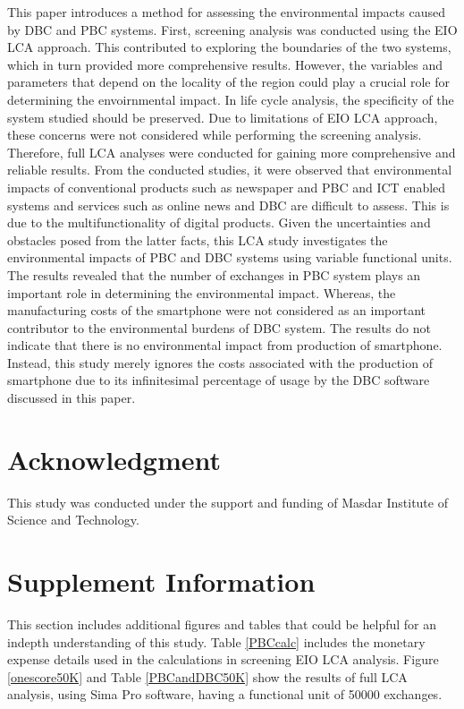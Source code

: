 \documentclass[conference]{IEEEtran}
\begin{document}
This paper introduces a method for assessing the environmental impacts caused by DBC and PBC systems. First, screening analysis was conducted using the EIO LCA approach. This contributed to exploring the boundaries of the two systems, which in turn provided more comprehensive results. However, the variables and parameters that depend on the locality of the region could play a crucial role for determining the envoirnmental impact. In life cycle analysis, the specificity of the system studied should be preserved. Due to limitations of EIO LCA approach, these concerns were not considered while performing the screening analysis. Therefore, full LCA analyses were conducted for gaining more comprehensive and reliable results. From the conducted studies, it were observed that environmental impacts of conventional products such as newspaper and PBC and ICT enabled systems and services such as online news and DBC are difficult to assess. This is due to the multifunctionality of digital products. Given the uncertainties and obstacles posed from the latter facts, this LCA study investigates the environmental impacts of PBC and DBC systems using variable functional units. The results revealed that the number of exchanges in PBC system plays an important role in determining the environmental impact. Whereas, the manufacturing costs of the smartphone were not considered as an important contributor to the environmental burdens of DBC system. The results do not indicate that there is no environmental impact from production of smartphone. Instead, this study merely ignores the costs associated with the production of smartphone due to its infinitesimal percentage of usage by the DBC software discussed in this paper.

\section*{Acknowledgment}

This study was conducted under the support and funding of Masdar Institute of Science and Technology.

\section{Supplement Information}\label{supplement}

This section includes additional figures and tables that could be helpful for an indepth understanding of this study. Table \ref{PBCcalc} includes the monetary expense details used in the calculations in screening EIO LCA analysis. Figure \ref{onescore50K} and Table \ref{PBCandDBC50K} show the results of full LCA analysis, using Sima Pro software, having a functional unit of 50000 exchanges.
\end{document}

